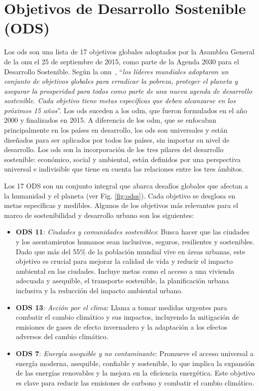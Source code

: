 \section{Objetivos de Desarrollo Sostenible (ODS)}
	Los \acrlong{ods} son una lista de 17 objetivos globales adoptados por la Asamblea General de la \acrfull{onu} el 25 de septiembre de 2015, como parte de la Agenda 2030 para el Desarrollo Sostenible. Según la \acrshort{onu}~\cite{un_sustainable_development}, ``\textit{los líderes mundiales adoptaron un conjunto de objetivos globales para erradicar la pobreza, proteger el planeta y asegurar la prosperidad para todos como parte de una nueva agenda de desarrollo sostenible. Cada objetivo tiene metas específicas que deben alcanzarse en los próximos 15 años}''.		
	Los \acrshort{ods} suceden a los \acrfull{odm}, que fueron formulados en el año 2000 y finalizados en 2015. A diferencia de los \acrshort{odm}, que se enfocaban principalmente en los países en desarrollo, los \acrshort{ods} son universales y están diseñados para ser aplicados por todos los países, sin importar su nivel de desarrollo. Los \acrlong{ods} son la incorporación de los tres pilares del desarrollo sostenible: económico, social y ambiental, están definidos por una perspectiva universal e indivisible que tiene en cuenta las relaciones entre los tres ámbitos.
		
	Los 17 ODS son un conjunto integral que abarca desafíos globales que afectan a la humanidad y el planeta (ver Fig. \ref{fig:odss}). Cada objetivo se desglosa en metas específicas y medibles. Algunos de los objetivos más relevantes para el marco de sostenibilidad y desarrollo urbano son los siguientes:
	\begin{itemize}
		\item \textbf{ODS 11}: \textit{Ciudades y comunidades sostenibles}: Busca hacer que las ciudades y los asentamientos humanos sean inclusivos, seguros, resilientes y sostenibles. Dado que más del 55\% de la población mundial vive en áreas urbanas, este objetivo es crucial para mejorar la calidad de vida y reducir el impacto ambiental en las ciudades. Incluye metas como el acceso a una vivienda adecuada y asequible, el transporte sostenible, la planificación urbana inclusiva y la reducción del impacto ambiental urbano.
		
		\item \textbf{ODS 13}: \textit{Acción por el clima}: Llama a tomar medidas urgentes para combatir el cambio climático y sus impactos, incluyendo la mitigación de emisiones de gases de efecto invernadero y la adaptación a los efectos adversos del cambio climático.
		
		\item \textbf{ODS 7}: \textit{Energía asequible y no contaminante}: Promueve el acceso universal a energía moderna, asequible, confiable y sostenible, lo que implica la expansión de las energías renovables y la mejora en la eficiencia energética. Este objetivo es clave para reducir las emisiones de carbono y combatir el cambio climático.
		
	\end{itemize}
		

